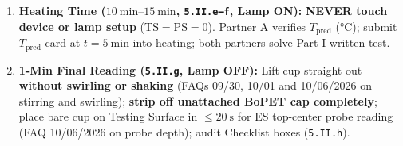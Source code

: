 \begin{devicebox}
{\begin{enumerate}
  \item \textbf{Heating Time ($\SIrange{10}{15}{\minute}$, \texttt{5.II.e--f}, Lamp ON):} \textbf{NEVER touch device or lamp setup} ($\mathrm{TS}=\mathrm{PS}=0$). Partner A verifies $T_{\mathrm{pred}}$ ($\si{\celsius}$); submit $T_{\mathrm{pred}}$ card at $t=\SI{5}{\minute}$ into heating; both partners solve Part I written test.
  \item \textbf{1-Min Final Reading (\texttt{5.II.g}, Lamp OFF):} Lift cup straight out \textbf{without swirling or shaking} (FAQs 09/30, 10/01 and 10/06/2026 on stirring and swirling); \textbf{strip off unattached BoPET cap completely}; place bare cup on Testing Surface in $\le \SI{20}{\second}$ for ES top-center probe reading (FAQ 10/06/2026 on probe depth); audit Checklist boxes (\texttt{5.II.h}).
\end{enumerate}}
\end{devicebox}

\par{}
